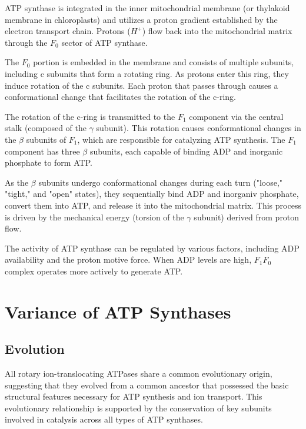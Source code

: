\documentclass{article}
\begin{document}
ATP synthase is integrated in the inner mitochondrial membrane (or thylakoid membrane in chloroplasts) and utilizes a proton gradient established by the electron transport chain. Protons ($H^+$) flow back into the mitochondrial matrix through the \textit{$F_0$} sector of ATP synthase.

The \textit{$F_0$} portion is embedded in the membrane and consists of multiple subunits, including c subunits that form a rotating ring. As protons enter this ring, they induce rotation of the c subunits. Each proton that passes through causes a conformational change that facilitates the rotation of the c-ring.

The rotation of the c-ring is transmitted to the \textit{$F_1$} component via the central stalk (composed of the $\gamma$ subunit). This rotation causes conformational changes in the $\beta$ subunits of \textit{$F_1$}, which are responsible for catalyzing ATP synthesis. The \textit{$F_1$} component has three $\beta$ subunits, each capable of binding ADP and inorganic phosphate to form ATP.

As the $\beta$ subunits undergo conformational changes during each turn ("loose," "tight," and "open" states), they sequentially bind ADP and inorganiv phosphate, convert them into ATP, and release it into the mitochondrial matrix. This process is driven by the mechanical energy (torsion of the $\gamma$ subunit) derived from proton flow.

The activity of ATP synthase can be regulated by various factors, including ADP availability and the proton motive force. When ADP levels are high, \textit{$F_1F_0$}  complex operates more actively to generate ATP.

\section{Variance of ATP Synthases}

\subsection{Evolution}

All rotary ion-translocating ATPases share a common evolutionary origin, suggesting that they evolved from a common ancestor that possessed the basic structural features necessary for ATP synthesis and ion transport. This evolutionary relationship is supported by the conservation of key subunits involved in catalysis across all types of ATP synthases.
\end{document}
